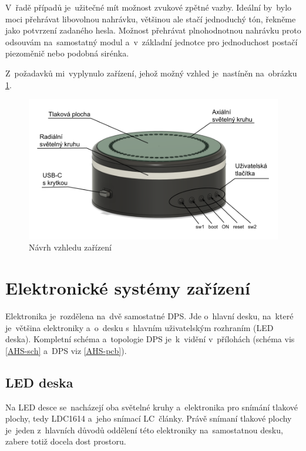 V~řadě případů je~užitečné mít možnost zvukové zpětné vazby.
Ideální by~bylo moci přehrávat libovolnou nahrávku, většinou ale stačí jednoduchý tón, řekněme jako potvrzení zadaného hesla.
Možnost přehrávat plnohodnotnou nahrávku proto odsouvám na~samostatný modul a~v~základní jednotce pro jednoduchost postačí piezoměnič nebo podobná sirénka.

Z~požadavků mi~vyplynulo zařízení, jehož možný vzhled je~nastíněn na~obrázku \ref{fig:AHS-nacrt}.
\begin{figure}[h]
    \centering
    \includegraphics[width=\textwidth]{text/PraktickaCast/img/AHS-nacrt.png}
    \caption{Návrh vzhledu zařízení}
    \label{fig:AHS-nacrt}
\end{figure}

\newpage
\section{Elektronické systémy zařízení}

Elektronika je~rozdělena na~dvě samostatné DPS.
Jde o~hlavní desku, na~které je~většina elektroniky a~o~desku s~hlavním uživatelským rozhraním (LED deska).
Kompletní schéma a~topologie DPS je~k~vidění v~přílohách (schéma vis \ref{AHS-sch} a~DPS viz \ref{AHS-pcb}).


\subsection{LED deska}
Na LED desce se~nacházejí oba světelné kruhy a~elektronika pro snímání tlakové plochy, tedy LDC1614 \cite{LDC1614} a~jeho snímací LC~články.
Právě snímaní tlakové plochy je~jeden z~hlavních důvodů oddělení této elektroniky na~samostatnou desku, zabere totiž docela dost prostoru.

